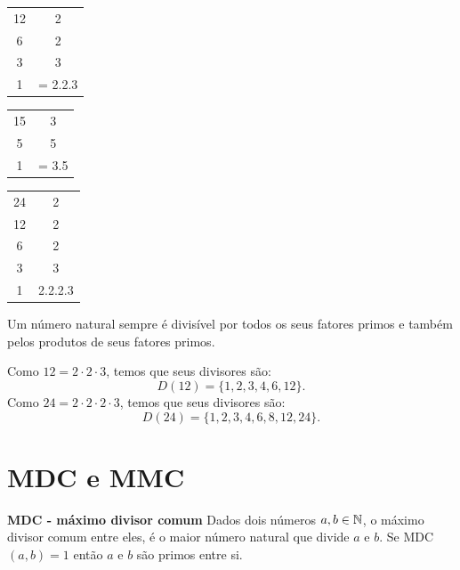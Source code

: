  \begin{multicols}{3}
   \begin{tabular}{c|c}
  12 & 2 \\
   6 & 2 \\
   3 & 3 \\
   1 & = 2.2.3 \\
 \end{tabular}

 \begin{tabular}{c|c}
  15 & 3 \\
   5 & 5 \\
   1 & = 3.5 \\
 \end{tabular}

 \begin{tabular}{c|c}
  24 & 2 \\
  12 & 2 \\
   6 & 2 \\
   3 & 3 \\
   1 & 2.2.2.3 \\
 \end{tabular}
 \end{multicols}

 \begin{obs}
 Um número natural sempre é divisível por todos os seus fatores primos e também pelos produtos de seus fatores primos.
 \end{obs}

 \begin{exem}
 Como $12= 2 \cdot 2 \cdot 3$, temos que seus divisores são: \[D(12)= \{1, 2, 3, 4, 6, 12\}.\]
 Como $24= 2 \cdot 2 \cdot 2 \cdot 3$, temos que seus divisores são: \[D(24)= \{1, 2, 3, 4, 6, 8, 12, 24\}.\]
 \end{exem}

 \section{MDC e MMC}

 \vskip0.3cm
 \colorbox{azul}{
 \begin{minipage}{0.9\linewidth}
 \begin{center}
  \textbf{MDC - máximo divisor comum}
  Dados dois números $a, b \in \mathbb{N}$, o máximo divisor comum entre eles, é o maior número natural que divide $a$ e $b$. Se MDC$(a, b)= 1$ então $a$ e $b$ são primos entre si.
 \end{center}
 \end{minipage}}

